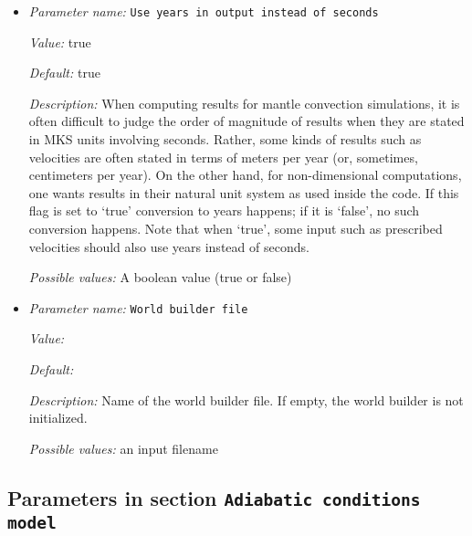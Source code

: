 \begin{itemize}
{\it Possible values:} A boolean value (true or false)
\item {\it Parameter name:} {\tt Use years in output instead of seconds}
\label{parameters:Use years in output instead of seconds}


{\it Value:} true


{\it Default:} true


{\it Description:} When computing results for mantle convection simulations, it is often difficult to judge the order of magnitude of results when they are stated in MKS units involving seconds. Rather, some kinds of results such as velocities are often stated in terms of meters per year (or, sometimes, centimeters per year). On the other hand, for non-dimensional computations, one wants results in their natural unit system as used inside the code. If this flag is set to `true' conversion to years happens; if it is `false', no such conversion happens. Note that when `true', some input such as prescribed velocities should also use years instead of seconds.


{\it Possible values:} A boolean value (true or false)
\item {\it Parameter name:} {\tt World builder file}
\label{parameters:World builder file}


{\it Value:} 


{\it Default:} 


{\it Description:} Name of the world builder file. If empty, the world builder is not initialized.


{\it Possible values:} an input filename
\end{itemize}



\subsection{Parameters in section \tt Adiabatic conditions model}
\label{parameters:Adiabatic_20conditions_20model}

